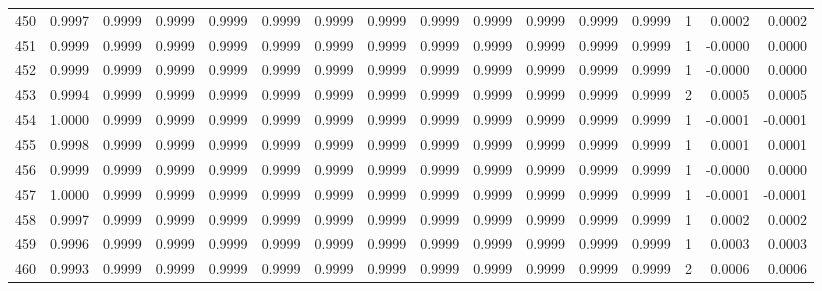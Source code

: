 \begin{tabular}{lrrrrrrrrrrrrrrr}
450 &      0.9997 &  0.9999 &  0.9999 &  0.9999 &  0.9999 &  0.9999 &  0.9999 &  0.9999 &  0.9999 &  0.9999 &   0.9999 &     0.9999 &      1 &                    0.0002 &                     0.0002 \\
451 &      0.9999 &  0.9999 &  0.9999 &  0.9999 &  0.9999 &  0.9999 &  0.9999 &  0.9999 &  0.9999 &  0.9999 &   0.9999 &     0.9999 &      1 &                   -0.0000 &                     0.0000 \\
452 &      0.9999 &  0.9999 &  0.9999 &  0.9999 &  0.9999 &  0.9999 &  0.9999 &  0.9999 &  0.9999 &  0.9999 &   0.9999 &     0.9999 &      1 &                   -0.0000 &                     0.0000 \\
453 &      0.9994 &  0.9999 &  0.9999 &  0.9999 &  0.9999 &  0.9999 &  0.9999 &  0.9999 &  0.9999 &  0.9999 &   0.9999 &     0.9999 &      2 &                    0.0005 &                     0.0005 \\
454 &      1.0000 &  0.9999 &  0.9999 &  0.9999 &  0.9999 &  0.9999 &  0.9999 &  0.9999 &  0.9999 &  0.9999 &   0.9999 &     0.9999 &      1 &                   -0.0001 &                    -0.0001 \\
455 &      0.9998 &  0.9999 &  0.9999 &  0.9999 &  0.9999 &  0.9999 &  0.9999 &  0.9999 &  0.9999 &  0.9999 &   0.9999 &     0.9999 &      1 &                    0.0001 &                     0.0001 \\
456 &      0.9999 &  0.9999 &  0.9999 &  0.9999 &  0.9999 &  0.9999 &  0.9999 &  0.9999 &  0.9999 &  0.9999 &   0.9999 &     0.9999 &      1 &                   -0.0000 &                     0.0000 \\
457 &      1.0000 &  0.9999 &  0.9999 &  0.9999 &  0.9999 &  0.9999 &  0.9999 &  0.9999 &  0.9999 &  0.9999 &   0.9999 &     0.9999 &      1 &                   -0.0001 &                    -0.0001 \\
458 &      0.9997 &  0.9999 &  0.9999 &  0.9999 &  0.9999 &  0.9999 &  0.9999 &  0.9999 &  0.9999 &  0.9999 &   0.9999 &     0.9999 &      1 &                    0.0002 &                     0.0002 \\
459 &      0.9996 &  0.9999 &  0.9999 &  0.9999 &  0.9999 &  0.9999 &  0.9999 &  0.9999 &  0.9999 &  0.9999 &   0.9999 &     0.9999 &      1 &                    0.0003 &                     0.0003 \\
460 &      0.9993 &  0.9999 &  0.9999 &  0.9999 &  0.9999 &  0.9999 &  0.9999 &  0.9999 &  0.9999 &  0.9999 &   0.9999 &     0.9999 &      2 &                    0.0006 &                     0.0006 \\

\end{tabular}
